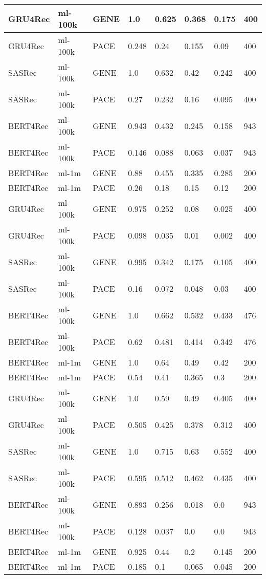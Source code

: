 \begin{longtable}{|l|l|l|l|l|l|l|l|}
GRU4Rec & ml-100k & GENE & 1.0 & 0.625 & 0.368 & 0.175 & 400 \\ \hline
GRU4Rec & ml-100k & PACE & 0.248 & 0.24 & 0.155 & 0.09 & 400 \\ \hline
SASRec & ml-100k & GENE & 1.0 & 0.632 & 0.42 & 0.242 & 400 \\ \hline
SASRec & ml-100k & PACE & 0.27 & 0.232 & 0.16 & 0.095 & 400 \\ \hline
BERT4Rec & ml-100k & GENE & 0.943 & 0.432 & 0.245 & 0.158 & 943 \\ \hline
BERT4Rec & ml-100k & PACE & 0.146 & 0.088 & 0.063 & 0.037 & 943 \\ \hline
BERT4Rec & ml-1m & GENE & 0.88 & 0.455 & 0.335 & 0.285 & 200 \\ \hline
BERT4Rec & ml-1m & PACE & 0.26 & 0.18 & 0.15 & 0.12 & 200 \\ \hline
GRU4Rec & ml-100k & GENE & 0.975 & 0.252 & 0.08 & 0.025 & 400 \\ \hline
GRU4Rec & ml-100k & PACE & 0.098 & 0.035 & 0.01 & 0.002 & 400 \\ \hline
SASRec & ml-100k & GENE & 0.995 & 0.342 & 0.175 & 0.105 & 400 \\ \hline
SASRec & ml-100k & PACE & 0.16 & 0.072 & 0.048 & 0.03 & 400 \\ \hline
BERT4Rec & ml-100k & GENE & 1.0 & 0.662 & 0.532 & 0.433 & 476 \\ \hline
BERT4Rec & ml-100k & PACE & 0.62 & 0.481 & 0.414 & 0.342 & 476 \\ \hline
BERT4Rec & ml-1m & GENE & 1.0 & 0.64 & 0.49 & 0.42 & 200 \\ \hline
BERT4Rec & ml-1m & PACE & 0.54 & 0.41 & 0.365 & 0.3 & 200 \\ \hline
GRU4Rec & ml-100k & GENE & 1.0 & 0.59 & 0.49 & 0.405 & 400 \\ \hline
GRU4Rec & ml-100k & PACE & 0.505 & 0.425 & 0.378 & 0.312 & 400 \\ \hline
SASRec & ml-100k & GENE & 1.0 & 0.715 & 0.63 & 0.552 & 400 \\ \hline
SASRec & ml-100k & PACE & 0.595 & 0.512 & 0.462 & 0.435 & 400 \\ \hline
BERT4Rec & ml-100k & GENE & 0.893 & 0.256 & 0.018 & 0.0 & 943 \\ \hline
BERT4Rec & ml-100k & PACE & 0.128 & 0.037 & 0.0 & 0.0 & 943 \\ \hline
BERT4Rec & ml-1m & GENE & 0.925 & 0.44 & 0.2 & 0.145 & 200 \\ \hline
BERT4Rec & ml-1m & PACE & 0.185 & 0.1 & 0.065 & 0.045 & 200 \\ \hline

\end{longtable}
